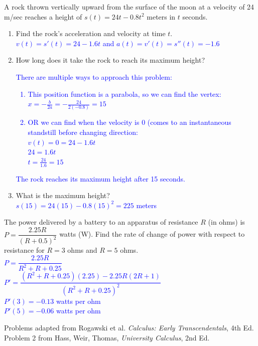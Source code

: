 \documentclass{ximera}
\begin{document}
\begin{exercise}
   A rock thrown vertically upward from the surface of the moon at a velocity of 24 m/sec reaches a height of $s(t)=24t-0.8t^2$ meters in $t$ seconds.
   \begin{enumerate}
       \item Find the rock's acceleration and velocity at time $t$.\\
       \textcolor{blue}{ $v(t)=s'(t)=24-1.6t$ and $a(t)=v'(t)=s''(t)=-1.6$}
       \item How long does it take the rock to reach its maximum height? \\
       \textcolor{blue}{ There are multiple ways to approach this problem:
       \begin{enumerate}
           \item This position function is a parabola, so we can find the vertex: 
           $x=-\frac{b}{2a}=-\frac{24}{2(-0.8)}=15$
           \item OR we can find when the velocity is 0 (comes to an instantaneous standstill before changing direction: \\
           $v(t)=0=24-1.6t$\\
           $24=1.6t$\\
           $t=\frac{24}{1.6}=15$
       \end{enumerate}
        The rock reaches its maximum height after 15 seconds.}
       \item What is the maximum height? \\
       \textcolor{blue}{ $s(15)=24(15)-0.8(15)^2=225$ meters}
       \end{enumerate}
    \end{exercise}
 
\begin{exercise}
    The power delivered by a battery to an apparatus of resistance $R$ (in ohms) is $P=\dfrac{2.25R}{(R+0.5)^2}$ watts (W).  Find the rate of change of power with respect to resistance for $R=3$ ohms and $R=5$ ohms.\\
    \textcolor{blue}{$P=\dfrac{2.25R}{R^2+R+0.25}$\\
    $P'=\dfrac{(R^2+R+0.25)(2.25)-2.25R(2R+1)}{(R^2+R+0.25)^2}$\\
    $P'(3)=-0.13$ watts per ohm\\
    $P'(5)=-0.06$ watts per ohm}
\end{exercise}

Problems adapted from Rogawski et al. \textit{Calculus: Early Transcendentals}, 4th Ed.  Problem 2 from Hass, Weir, Thomas, \textit{University Calculus}, 2nd Ed.
\end{document}
